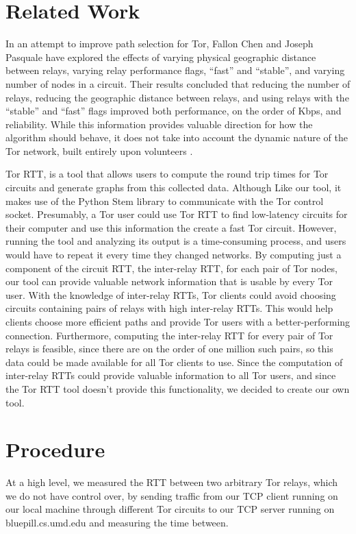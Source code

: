 \documentclass[twocolumn,11pt]{article}
\begin{document}
\section{Related Work}

In an attempt to improve path selection for Tor, Fallon Chen and Joseph Pasquale have explored the effects of varying physical geographic distance between relays, varying relay performance flags, ``fast'' and ``stable'', and varying number of nodes in a circuit. Their results concluded that reducing the number of relays, reducing the geographic distance between relays, and using relays with the ``stable'' and ``fast'' flags improved both performance, on the order of Kbps, and reliability. While this information provides valuable direction for how the algorithm should behave, it does not take into account the dynamic nature of the Tor network, built entirely upon volunteers \cite{improving}.  
 
 Tor RTT, is a tool that allows users to compute the round trip times for Tor circuits and generate graphs from this collected data. Although  Like our tool, it makes use of the Python Stem library to communicate with the Tor control socket. Presumably, a Tor user could use Tor RTT to find low-latency circuits for their computer and use this information the create a fast Tor circuit. However, running the tool and analyzing its output is a time-consuming process, and users would have to repeat it every time they changed networks. By computing just a component of the circuit RTT, the inter-relay RTT, for each pair of Tor nodes, our tool can provide valuable network information that is usable by every Tor user. With the knowledge of inter-relay RTTs, Tor clients could avoid choosing circuits containing pairs of relays with high inter-relay RTTs. This would help clients choose more efficient paths and provide Tor users with a better-performing connection. Furthermore, computing the inter-relay RTT for every pair of Tor relays is feasible, since there are on the order of one million such pairs, so this data could be made available for all Tor clients to use. Since the computation of inter-relay RTTs could provide valuable information to all Tor users, and since the Tor RTT tool doesn't provide this functionality, we decided to create our own tool. \cite{rtt}

\section{Procedure}
At a high level, we measured the RTT between two arbitrary Tor relays, which we do not have control over, by sending traffic from our TCP client running on our local machine through different Tor circuits to our TCP server running on bluepill.cs.umd.edu and measuring the time between. 
\end{document}
